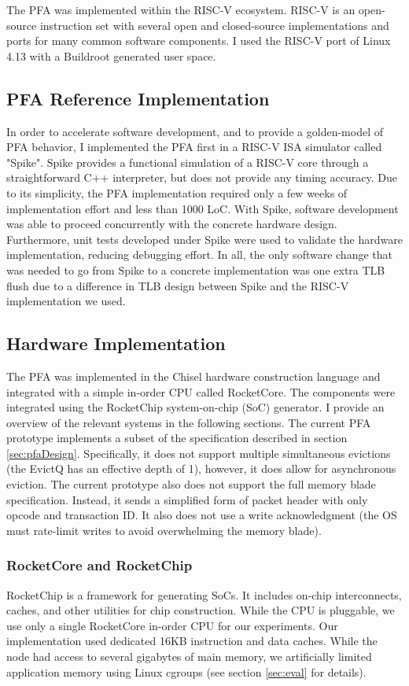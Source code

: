 The PFA was implemented within the RISC-V ecosystem. RISC-V is an open-source
instruction set with several open and closed-source implementations and ports
for many common software components\cite{riscv}. I used the RISC-V port of
Linux 4.13 with a Buildroot generated user
space.

\subsection{PFA Reference Implementation}
In order to accelerate software development, and to provide a golden-model of
PFA behavior, I implemented the PFA first in a RISC-V ISA simulator called
"Spike"\cite{spike}. Spike provides a functional simulation of a RISC-V core
through a straightforward C++ interpreter, but does not provide any timing
accuracy. Due to its simplicity, the PFA implementation required only a few
weeks of implementation effort and less than 1000 LoC. With Spike, software
development was able to proceed concurrently with the concrete hardware design.
Furthermore, unit tests developed under Spike were used to validate the
hardware implementation, reducing debugging effort. In all, the only software
change that was needed to go from Spike to a concrete implementation was one
extra TLB flush due to a difference in TLB design between Spike and the RISC-V
implementation we used.

\subsection{Hardware Implementation}
The PFA was implemented in the Chisel hardware construction
language\cite{chisel} and integrated with a simple in-order CPU called
RocketCore\cite{rocketCore}. The components were integrated using the
RocketChip system-on-chip (SoC) generator\cite{rocketChip}. I provide an
overview of the relevant systems in the following sections. The current PFA
prototype implements a subset of the specification described in
section \ref{sec:pfaDesign}. Specifically, it does not support multiple
simultaneous evictions (the EvictQ has an effective depth of 1), however, it
does allow for asynchronous eviction. The current prototype also does not
support the full memory blade specification. Instead, it sends a simplified form
of packet header with only opcode and transaction ID. It also does not use a
write acknowledgment (the OS must rate-limit writes to avoid overwhelming the
memory blade).
 
\subsubsection{RocketCore and RocketChip}
RocketChip\cite{rocketChip} is a framework for generating SoCs. It includes on-chip
interconnects, caches, and other utilities for chip construction. While the CPU
is pluggable, we use only a single RocketCore in-order CPU for our experiments. Our
implementation used dedicated 16KB instruction and data caches. While the node had access to several
gigabytes of main memory, we artificially limited application memory using
Linux cgroups (see section \ref{sec:eval} for details).

